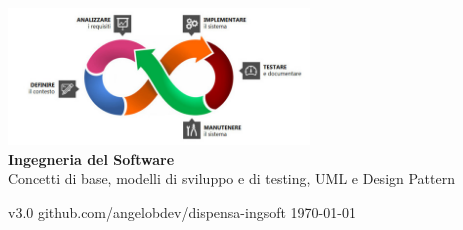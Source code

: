 \documentclass[a4paper,12pt,oneside]{book}
\begin{document}
\begin{titlepage}
  \centering

  \includegraphics[width=0.6\textwidth]{assets/logo.jpg}\\[3cm]

  {\huge\bfseries Ingegneria del Software}\\[0.5cm]

  {\Large Concetti di base, modelli di sviluppo e di testing, UML e Design Pattern}\\[0.5cm]

  \vfill

  {\small v3.0 \hfill github.com/angelobdev/dispensa-ingsoft \hfill \today }\\[0.5cm]

\end{titlepage}

\tableofcontents








\end{document}
